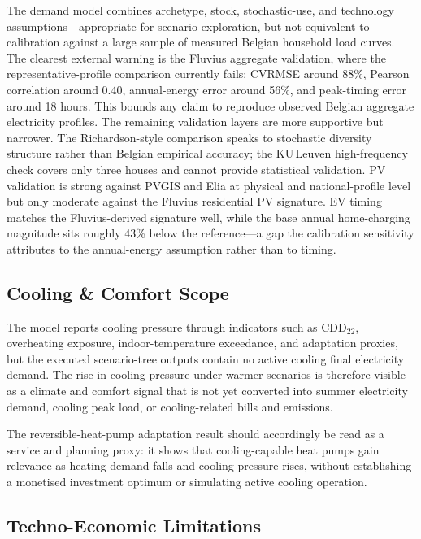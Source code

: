 The demand model combines archetype, stock, stochastic-use, and technology assumptions---appropriate for scenario exploration, but not equivalent to calibration against a large sample of measured Belgian household load curves. The clearest external warning is the Fluvius aggregate validation, where the representative-profile comparison currently fails: CVRMSE around 88\%, Pearson correlation around 0.40, annual-energy error around 56\%, and peak-timing error around 18 hours. This bounds any claim to reproduce observed Belgian aggregate electricity profiles.
\newline The remaining validation layers are more supportive but narrower. The Richardson-style comparison speaks to stochastic diversity structure rather than Belgian empirical accuracy; the KU\,Leuven high-frequency check covers only three houses and cannot provide statistical validation. PV validation is strong against PVGIS and Elia at physical and national-profile level but only moderate against the Fluvius residential PV signature. EV timing matches the Fluvius-derived signature well, while the base annual home-charging magnitude sits roughly 43\% below the reference---a gap the calibration sensitivity attributes to the annual-energy assumption rather than to timing.


\subsection{Cooling \& Comfort Scope}
\label{sec:limitationsCooling}

The model reports cooling pressure through indicators such as $\text{CDD}_{22}$, overheating exposure, indoor-temperature exceedance, and adaptation proxies, but the executed scenario-tree outputs contain no active cooling final electricity demand. The rise in cooling pressure under warmer scenarios is therefore visible as a climate and comfort signal that is not yet converted into summer electricity demand, cooling peak load, or cooling-related bills and emissions.

The reversible-heat-pump adaptation result should accordingly be read as a service and planning proxy: it shows that cooling-capable heat pumps gain relevance as heating demand falls and cooling pressure rises, without establishing a monetised investment optimum or simulating active cooling operation.


\subsection{Techno-Economic Limitations}
\label{sec:limitationsTechnoEconomic}

